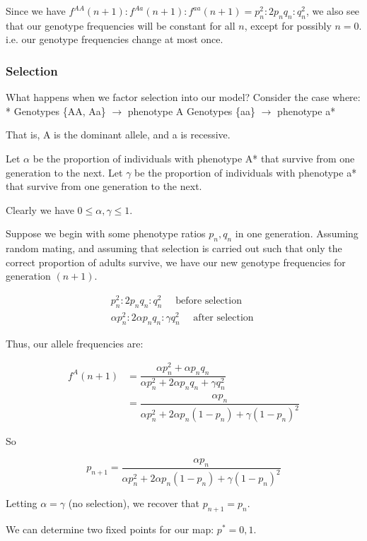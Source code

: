 \documentclass[11pt]{article}
\begin{document}
Since we have
\(f^{AA}(n+1) : f^{Aa}(n+1) : f^{aa}(n+1) = p_n^2 : 2p_nq_n : q_n^2\),
we also see that our genotype frequencies will be constant for all
\(n\), except for possibly \(n = 0\). i.e. our genotype frequencies
change at most once.

\subsubsection{Selection}\label{selection}

What happens when we factor selection into our model? Consider the case
where: * Genotypes \{AA, Aa\} \(\to\) phenotype A\emph{ } Genotypes
\{aa\} \(\to\) phenotype a*

That is, A is the dominant allele, and a is recessive.

Let \(\alpha\) be the proportion of individuals with phenotype A* that
survive from one generation to the next. Let \(\gamma\) be the
proportion of individuals with phenotype a* that survive from one
generation to the next.

Clearly we have \(0 \le \alpha, \gamma \le 1\).

Suppose we begin with some phenotype ratios \(p_n, q_n\) in one
generation. Assuming random mating, and assuming that selection is
carried out such that only the correct proportion of adults survive, we
have our new genotype frequencies for generation \((n+1)\).

\begin{align*}
    p_n^2 : 2p_nq_n : q_n^2 \quad \text{ before selection }\\
    \alpha p_n^2 : 2\alpha p_nq_n : \gamma q_n^2 \quad \text { after selection }
\end{align*}

Thus, our allele frequencies are:

\begin{align*}
    f^A(n+1) &= \dfrac{\alpha p_n^2 + \alpha p_nq_n}{\alpha p_n^2 + 2\alpha p_n q_n + \gamma q_n^2}\\
             &= \dfrac{\alpha p_n}{\alpha p_n^2 + 2\alpha p_n(1-p_n) + \gamma (1-p_n)^2}
\end{align*}

So

\[p_{n+1} = \dfrac{\alpha p_n}{\alpha p_n^2 + 2\alpha p_n(1-p_n) + \gamma (1-p_n)^2}\]

Letting \(\alpha = \gamma\) (no selection), we recover that
\(p_{n+1} = p_n\).

We can determine two fixed points for our map: \(p^* = 0, 1\).
\end{document}
